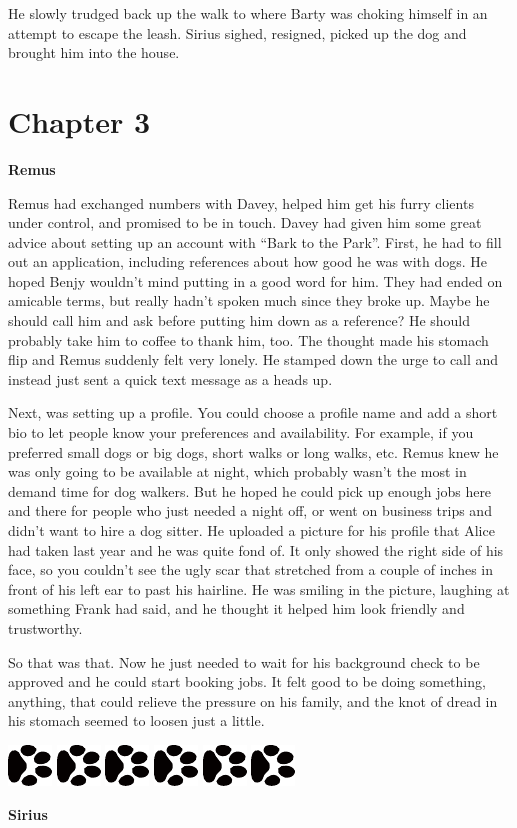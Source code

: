 \documentclass[12pt,twoside,openright]{memoir}
\newcommand{\dogPrintRule}{	
	\begin{center}
		\hspace{.5em}
		\includegraphics[angle=60]{dogprint.pdf}
		\hspace{.5em}
		\includegraphics[angle=120]{dogprint.pdf}
		\hspace{.5em}
		\includegraphics[angle=60]{dogprint.pdf}
		\hspace{.5em}
		\includegraphics[angle=120]{dogprint.pdf}
		\hspace{.5em}
		\includegraphics[angle=60]{dogprint.pdf}
		\hspace{.5em}
		\includegraphics[angle=120]{dogprint.pdf}
		\hspace{.5em}
	\end{center}
}
\begin{document}
He slowly trudged back up the walk to where Barty was choking himself in an attempt to escape the leash. Sirius sighed, resigned, picked up the dog and brought him into the house.

\chapter*{Chapter 3}

\textbf{Remus} 

Remus had exchanged numbers with Davey, helped him get his furry clients under control, and promised to be in touch. Davey had given him some great advice about setting up an account with ``Bark to the Park''. First, he had to fill out an application, including references about how good he was with dogs. He hoped Benjy wouldn't mind putting in a good word for him. They had ended on amicable terms, but really hadn't spoken much since they broke up. Maybe he should call him and ask before putting him down as a reference? He should probably take him to coffee to thank him, too. The thought made his stomach flip and Remus suddenly felt very lonely. He stamped down the urge to call and instead just sent a quick text message as a heads up.

Next, was setting up a profile. You could choose a profile name and add a short bio to let people know your preferences and availability. For example, if you preferred small dogs or big dogs, short walks or long walks, etc. Remus knew he was only going to be available at night, which probably wasn't the most in demand time for dog walkers. But he hoped he could pick up enough jobs here and there for people who just needed a night off, or went on business trips and didn't want to hire a dog sitter. He uploaded a picture for his profile that Alice had taken last year and he was quite fond of. It only showed the right side of his face, so you couldn't see the ugly scar that stretched from a couple of inches in front of his left ear to past his hairline. He was smiling in the picture, laughing at something Frank had said, and he thought it helped him look friendly and trustworthy. 

So that was that. Now he just needed to wait for his background check to be approved and he could start booking jobs. It felt good to be doing something, anything, that could relieve the pressure on his family, and the knot of dread in his stomach seemed to loosen just a little.

\dogPrintRule

\textbf{Sirius} 
\end{document}
